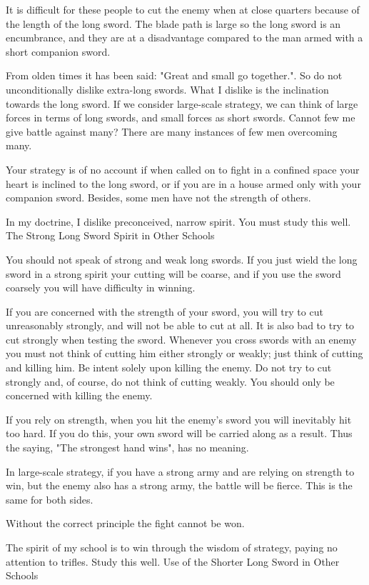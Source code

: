 It is difficult for these people to cut the enemy when at close quarters because of the length of the long sword. The blade path is large so the long sword is an encumbrance, and they are at a disadvantage compared to the man armed with a short companion sword.

From olden times it has been said: "Great and small go together.". So do not unconditionally dislike extra-long swords. What I dislike is the inclination towards the long sword. If we consider large-scale strategy, we can think of large forces in terms of long swords, and small forces as short swords. Cannot few me give battle against many? There are many instances of few men overcoming many.

Your strategy is of no account if when called on to fight in a confined space your heart is inclined to the long sword, or if you are in a house armed only with your companion sword. Besides, some men have not the strength of others.

In my doctrine, I dislike preconceived, narrow spirit. You must study this well.
The Strong Long Sword Spirit in Other Schools

You should not speak of strong and weak long swords. If you just wield the long sword in a strong spirit your cutting will be coarse, and if you use the sword coarsely you will have difficulty in winning.

If you are concerned with the strength of your sword, you will try to cut unreasonably strongly, and will not be able to cut at all. It is also bad to try to cut strongly when testing the sword. Whenever you cross swords with an enemy you must not think of cutting him either strongly or weakly; just think of cutting and killing him. Be intent solely upon killing the enemy. Do not try to cut strongly and, of course, do not think of cutting weakly. You should only be concerned with killing the enemy.

If you rely on strength, when you hit the enemy's sword you will inevitably hit too hard. If you do this, your own sword will be carried along as a result. Thus the saying, "The strongest hand wins", has no meaning.

In large-scale strategy, if you have a strong army and are relying on strength to win, but the enemy also has a strong army, the battle will be fierce. This is the same for both sides.

Without the correct principle the fight cannot be won.

The spirit of my school is to win through the wisdom of strategy, paying no attention to trifles. Study this well.
Use of the Shorter Long Sword in Other Schools

